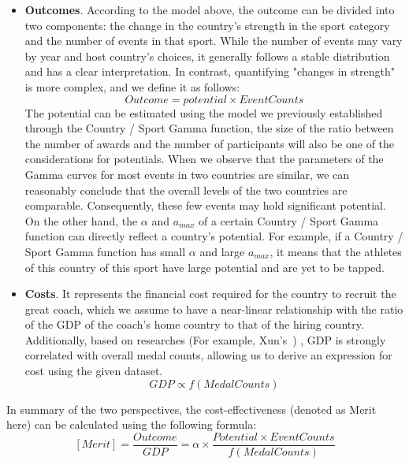 \documentclass{mcmthesis}
\begin{document}
\begin{itemize}
    \item {\bf Outcomes}. According to the model above, the outcome can be divided into two components: the change in the country's strength in the sport category and the number of events in that sport. While the number of events may vary by year and host country's choices, it generally follows a stable distribution and has a clear interpretation. In contrast, quantifying "changes in strength" is more complex, and we define it as follows:
    \[
    Outcome = potential \times EventCounts
    \]
    The potential can be estimated using the model we previously established through the Country / Sport Gamma function, the size of the ratio between the number of awards and the number of participants will also be one of the considerations for potentials. When we observe that the parameters of the Gamma curves for most events in two countries are similar, we can reasonably conclude that the overall levels of the two countries are comparable. Consequently, these few events may hold significant potential.
    On the other hand, the $\alpha$ and $a_{max}$ of a certain Country / Sport Gamma function can directly reflect a country's potential. For example, if a Country / Sport Gamma function has small $\alpha$ and large $a_{max}$, it means that the athletes of this country of this sport have large potential and are yet to be tapped.
    
    
    \item {\bf Costs}. It represents the financial cost required for the country to recruit the great coach, which we assume to have a near-linear relationship with the ratio of the GDP of the coach's home country to that of the hiring country. Additionally, based on researches (For example, Xun's~\cite{9}) , GDP is strongly correlated with overall medal counts, allowing us to derive an expression for cost using the given dataset.
    \[
    GDP \propto f(MedalCounts)
    \]
    
\end{itemize}

In summary of the two perspectives, the cost-effectiveness (denoted as Merit here) can be calculated using the following formula:
\[
[Merit] = \frac{Outcome}{GDP} = \alpha \times \frac{Potential \times EventCounts}{f(MedalCounts)}
\]
\end{document}
